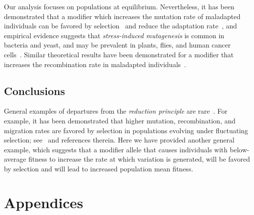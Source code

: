 \documentclass[9pt, a4paper, twocolumn]{extarticle}
\newcommand*{\tr}{^\intercal}
\newcommand{\matrx}[1]{{\left[ \stackrel{}{#1}\right]}}
\newcommand{\diag}[1]{\mbox{diag}\matrx{#1}}
\newtheorem{lemma}{Lemma}
\begin{document}
Our analysis focuses on populations at equilibrium.
Nevertheless, it has been demonstrated that a modifier which increases the mutation rate of maladapted individuals can be favored by selection~\citep{Ram2012} and reduce the adaptation rate~\citep{Ram2014},
and empirical evidence suggests that \emph{stress-induced mutagenesis} is common in bacteria and yeast, and may be prevalent in plants, flies, and human cancer cells~\citep{Rosenberg2012,Fitzgerald2017b}.
Similar theoretical results have been demonstrated for a modifier that increases the recombination rate in maladapted individuals~\citep{Hadany2003b,Hadany2003a}.

\subsection*{Conclusions}

General examples of departures from the \emph{reduction principle} are rare~\citep{Altenberg2017}.
For example, it has been demonstrated that higher mutation, recombination, and migration rates are favored by selection in populations evolving under fluctuating selection; see~\citet{Carja2014} and references therein.
Here we have provided another general example, which suggests that a modifier allele that causes individuals with below-average fitness to increase the rate at which variation is generated, will be favored by selection and will lead to increased population mean fitness.

\section*{Appendices}


\end{document}
